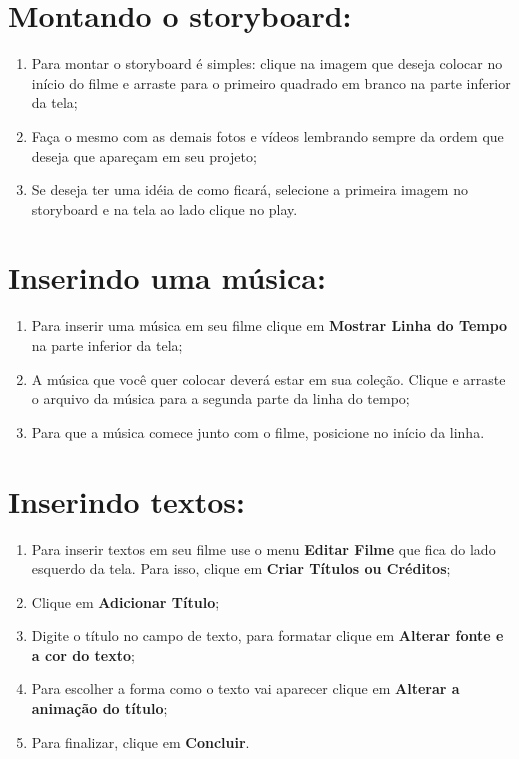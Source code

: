\documentclass{article}
\begin{document}
\section{Montando o storyboard:}
\begin{enumerate}
\item Para montar o storyboard é simples: clique na imagem que deseja colocar no início do filme e arraste para o primeiro quadrado em branco na parte inferior da tela;
\item Faça o mesmo com as demais fotos e vídeos lembrando sempre da ordem que deseja que apareçam em seu projeto;
\item Se deseja ter uma idéia de como ficará, selecione a primeira imagem no storyboard e na tela ao lado clique no play.
\end{enumerate}

\section{Inserindo uma música:}
\begin{enumerate}
\item Para inserir uma música em seu filme clique em \textbf{Mostrar Linha do Tempo} na parte inferior da tela;
\item A música que você quer colocar deverá estar em sua coleção. Clique e arraste o arquivo da música para a segunda parte da linha do tempo;
\item Para que a música comece junto com o filme, posicione no início da linha.
\end{enumerate}

\section{Inserindo textos:}
\begin{enumerate}
\item Para inserir textos em seu filme use o menu \textbf{Editar Filme} que fica do lado esquerdo da tela. Para isso, clique em \textbf{Criar Títulos ou Créditos};
\item Clique em \textbf{Adicionar Título};
\item Digite o título no campo de texto, para formatar clique em \textbf{Alterar fonte e a cor do texto};
\item Para escolher a forma como o texto vai aparecer clique em \textbf{Alterar a animação do título};
\item Para finalizar, clique em \textbf{Concluir}.
\end{enumerate}
\end{document}
